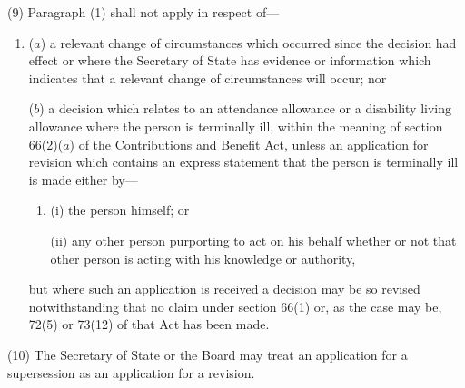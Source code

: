 \documentclass[12pt,a4paper]{article}
\begin{document}

(9) Paragraph (1) shall not apply in respect of—
\begin{enumerate}\item[]
($a$) a relevant change of circumstances which occurred since the decision 
had effect  %
or where the Secretary of State has evidence or information which indicates that a relevant change of circumstances will occur; nor

($b$) a decision which relates to an attendance allowance or a disability living allowance where the person is terminally ill, within the meaning of section 66(2)($a$) of the Contributions and Benefit Act, unless an application for revision which contains an express statement that the person is terminally ill is made either by—
\begin{enumerate}\item[]
(i) the person himself; or

(ii) any other person purporting to act on his behalf whether or not that other person is acting with his knowledge or authority,
\end{enumerate}
but where such an application is received a decision may be so revised notwithstanding that no claim under section 66(1) or, as the case may be, 72(5) or 73(12) of that Act has been made.
\end{enumerate}

(10) The Secretary of State 
or the Board  %
may treat an application for a supersession as an application for a revision.
\end{document}
